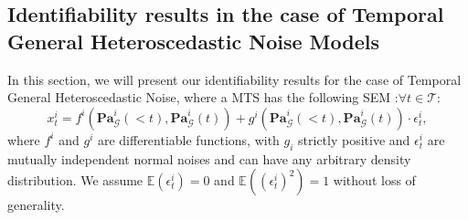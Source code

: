 \subsection{Identifiability results in the case of Temporal General Heteroscedastic Noise Models}
\label{sec_TGRHNM}
In this section, we will present our identifiability results for the case of Temporal General Heteroscedastic Noise, where a MTS has the following SEM :$\forall t \in \mathcal{T}$:
\begin{equation}
  x_t^i= f^i\left(\mathbf{P a}_{\mathcal{G}}^i(<t), \mathbf{P a}_{\mathcal{G}}^i(t)\right)+g^i\left(\mathbf{P a}_{\mathcal{G}}^i(<t), \mathbf{P a}_{\mathcal{G}}^i(t)\right)\cdot\epsilon_t^{i},
\label{eq_hetero_general_hetero}
\end{equation}  
where $f^i$ and $g^i$ are differentiable functions, with $g_i$ strictly positive and $\epsilon^{i}_t$ are mutually independent normal noises and can have any arbitrary density distribution. We assume $\mathbb{E}(\epsilon_t^{i}) = 0$ and $\mathbb{E}((\epsilon_t^{i})^2) = 1$ without loss of generality.

